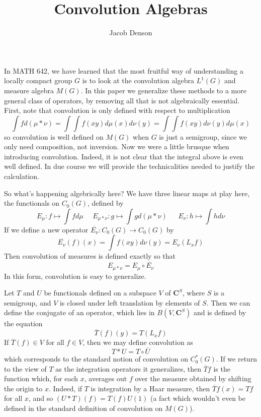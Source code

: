 \documentclass{article}
\title{Convolution Algebras}
\author{Jacob Denson}
\theoremstyle{plain}
\theoremstyle{definition}
\begin{document}
\maketitle

In MATH 642, we have learned that the most fruitful way of understanding a locally compact group $G$ is to look at the convolution algebra $L^1(G)$ and measure algebra $M(G)$. In this paper we generalize these methods to a more general class of operators, by removing all that is not algebraically essential. First, note that convolution is only defined with respect to multiplication
%
\[ \int f d(\mu * \nu) = \int \int f(xy) d\mu(x) d\nu(y) = \int \int f(xy) d\nu(y) d\mu(x) \]
%
so convolution is well defined on $M(G)$ when $G$ is just a semigroup, since we only need composition, not inversion. Now we were a little brusque when introducing convolution. Indeed, it is not clear that the integral above is even well defined. In due course we will provide the technicalities needed to justify the calculation.

So what's happening algebrically here? We have three linear maps at play here, the functionals on $C_0(G)$, defined by
%
\[ E_\mu: f \mapsto \int f d\mu\ \ \ \ \ \ E_{\mu * \nu}: g \mapsto \int g d(\mu * \nu)\ \ \ \ \ \ \ E_\nu: h \mapsto \int h d\nu \]
%
If we define a new operator $\overline{E_\nu}: C_0(G) \to C_0(G)$ by
%
\[ \overline{E_\nu}(f)(x) = \int f(xy) d\nu(y) = E_\nu(L_x f) \]
%
Then convolution of measures is defined exactly so that
%
\[ E_{\mu * \nu} = E_\mu \circ \overline{E_\nu} \]
%
In this form, convolution is easy to generalize.

Let $T$ and $U$ be functionals defined on a subspace $V$ of $\mathbf{C}^S$, where $S$ is a semigroup, and $V$ is closed under left translation by elements of $S$. Then we can define the conjugate of an operator, which lies in $B(V,\mathbf{C}^S)$ and is defined by the equation
%
\[ \overline{T}(f)(y) = T(L_x f) \]
%
If $\overline{T}(f) \in V$ for all $f \in V$, then we may define convolution as
%
\[ T * U = T \circ \overline{U} \]
%
which corresponds to the standard notion of convolution on $C_0^*(G)$. If we return to the view of $T$ as the integration operators it generalizes, then $\overline{T}f$ is the function which, for each $x$, averages out $f$ over the measure obtained by shifting the origin to $x$. Indeed, if $T$ is integration by a Haar measure, then $\overline{T} f (x) = Tf$ for all $x$, and so $(U * T)(f) = T(f) U(1)$ (a fact which wouldn't even be defined in the standard definition of convolution on $M(G)$).
\end{document}

